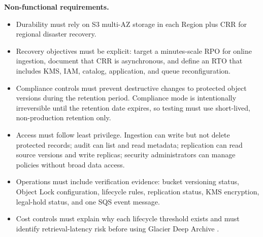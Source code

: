 \textbf{Non-functional requirements.}
\begin{itemize}
    \item Durability must rely on S3 multi-AZ storage in each Region plus CRR for regional disaster recovery.
    \item Recovery objectives must be explicit: target a minutes-scale RPO for online ingestion, document that CRR is asynchronous, and define an RTO that includes KMS, IAM, catalog, application, and queue reconfiguration.
    \item Compliance controls must prevent destructive changes to protected object versions during the retention period. Compliance mode is intentionally irreversible until the retention date expires, so testing must use short-lived, non-production retention only.
    \item Access must follow least privilege. Ingestion can write but not delete protected records; audit can list and read metadata; replication can read source versions and write replicas; security administrators can manage policies without broad data access.
    \item Operations must include verification evidence: bucket versioning status, Object Lock configuration, lifecycle rules, replication status, KMS encryption, legal-hold status, and one SQS event message.
    \item Cost controls must explain why each lifecycle threshold exists and must identify retrieval-latency risk before using Glacier Deep Archive \cite{awsS3StorageClasses}.
\end{itemize}

